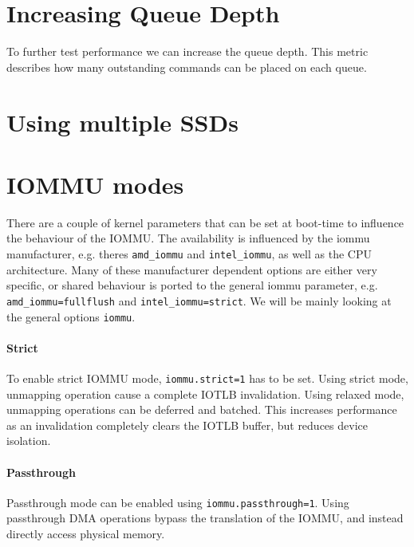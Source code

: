 \section{Increasing Queue Depth}
To further test performance we can increase the queue depth. This metric describes how many outstanding commands can be placed on each queue.

\section{Using multiple SSDs}

\section{IOMMU modes}
There are a couple of kernel parameters that can be set at boot-time to influence the behaviour of the IOMMU. The availability is influenced by the iommu manufacturer, e.g. theres \texttt{amd\_iommu} and \texttt{intel\_iommu}, as well as the CPU architecture. Many of these manufacturer dependent options are either very specific, or shared behaviour is ported to the general iommu parameter, e.g. \texttt{amd\_iommu=fullflush} and \texttt{intel\_iommu=strict}. We will be mainly looking at the general options \texttt{iommu}.

\paragraph{Strict}
To enable strict IOMMU mode, \texttt{iommu.strict=1} has to be set. Using strict mode, unmapping operation cause a complete IOTLB invalidation. Using relaxed mode, unmapping operations can be deferred and batched. This increases performance as an invalidation completely clears the IOTLB buffer, but reduces device isolation.

\paragraph{Passthrough}
Passthrough mode can be enabled using \texttt{iommu.passthrough=1}. Using passthrough DMA operations bypass the translation of the IOMMU, and instead directly access physical memory.